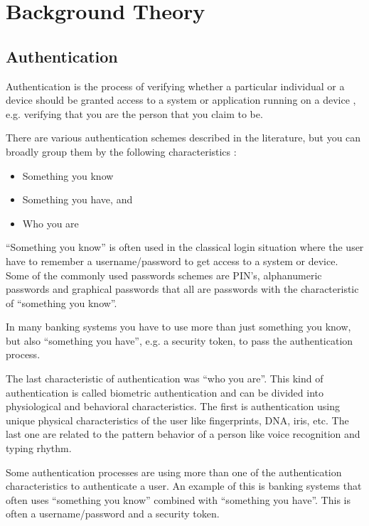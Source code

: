 \chapter{Background Theory}

  \section{Authentication}

    Authentication is the process of verifying whether a particular individual or a device should be granted access to a system or application running on a device \cite{IPAS}, e.g. verifying that you are the person that you claim to be.

    There are various authentication schemes described in the literature, but you can broadly group them by the following characteristics \cite{IPAS}:

      \begin{itemize}
        \item Something you know
        \item Something you have, and
        \item Who you are
      \end{itemize}

    ``Something you know'' is often used in the classical login situation where the user have to remember a username/password to get access to a system or device. Some of the commonly used passwords schemes are PIN's, alphanumeric passwords and graphical passwords that all are passwords with the characteristic of ``something you know''.

    In many banking systems you have to use more than just something you know, but also ``something you have'', e.g. a security token, to pass the authentication process. 

    The last characteristic of authentication was ``who you are''. This kind of authentication is called biometric authentication and can be divided into physiological and behavioral characteristics. The first is authentication using unique physical characteristics of the user like fingerprints, DNA, iris, etc. The last one are related to the pattern behavior of a person like voice recognition and typing rhythm. 

    Some authentication processes are using more than one of the authentication characteristics to authenticate a user. An example of this is banking systems that often uses ``something you know'' combined with ``something you have''. This is often a username/password and a security token. 


